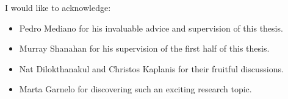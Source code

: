 \cleardoublepage


\begin{acknowledgements}





I would like to acknowledge:
\begin{itemize}
 \item Pedro Mediano for his invaluable advice and supervision of this thesis.
 \vspace*{3mm}
 \item Murray Shanahan for his supervision of the first half of this thesis.
 \vspace*{3mm}
 \item Nat Dilokthanakul and Christos Kaplanis for their fruitful discussions.
 \vspace*{3mm}
 \item Marta Garnelo for discovering such an exciting research topic.
\end{itemize}

\end{acknowledgements}
